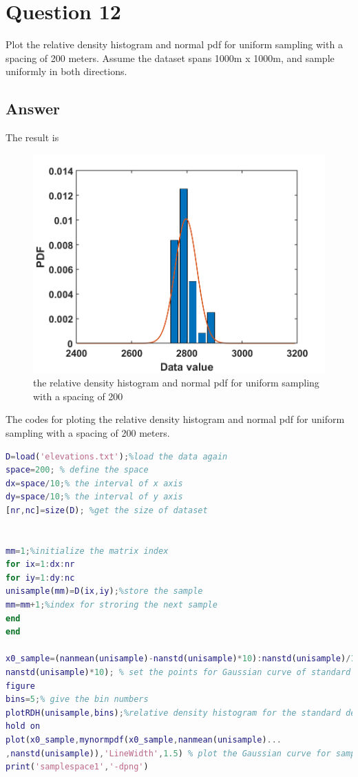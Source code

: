 \documentclass[
	12pt, %
]{fphw}
\begin{document}
 \section*{Question 12 }

\begin{problem}
Plot the relative density histogram and normal pdf for uniform sampling with a spacing of 200
meters. Assume the dataset spans 1000m x 1000m, and sample uniformly in both directions.
	
\end{problem}

\subsection*{Answer}

The result is

\begin{figure}[htbp]
	\centering
	\includegraphics[width=0.8\columnwidth]{samplespace1.png} 
	\caption{ the relative density histogram and normal pdf for uniform sampling with a spacing of 200}
\end{figure}

The codes for ploting the relative density histogram and normal pdf for uniform sampling with a spacing of 200
meters.

\begin{lstlisting}[language=Matlab,escapeinside=``]
D=load('elevations.txt');%load the data again
space=200; % define the space
dx=space/10;% the interval of x axis
dy=space/10;% the interval of y axis
[nr,nc]=size(D); %get the size of dataset


mm=1;%initialize the matrix index
for ix=1:dx:nr
for iy=1:dy:nc
unisample(mm)=D(ix,iy);%store the sample
mm=mm+1;%index for stroring the next sample     
end
end

x0_sample=(nanmean(unisample)-nanstd(unisample)*10):nanstd(unisample)/10:(nanmean(unisample)+...
nanstd(unisample)*10); % set the points for Gaussian curve of standard deviation of sample
figure
bins=5;% give the bin numbers
plotRDH(unisample,bins);%relative density histogram for the standard deviation value
hold on
plot(x0_sample,mynormpdf(x0_sample,nanmean(unisample)...
,nanstd(unisample)),'LineWidth',1.5) % plot the Gaussian curve for samples
print('samplespace1','-dpng')
\end{lstlisting}
\end{document}
